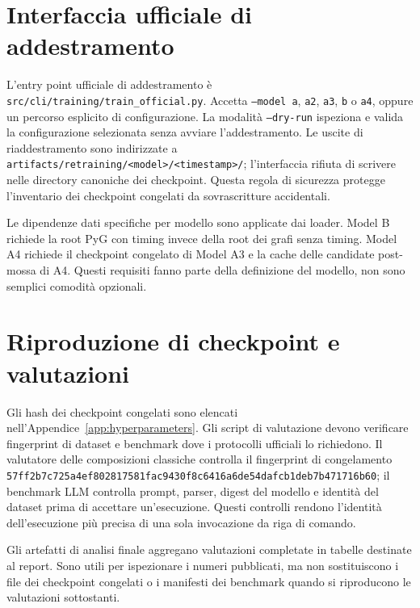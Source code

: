 

\section{Interfaccia ufficiale di addestramento}
\label{app:reproducibility:training}

L'entry point ufficiale di addestramento è \texttt{src/cli/training/train\_official.py}.  Accetta \texttt{--model a}, \texttt{a2}, \texttt{a3}, \texttt{b} o \texttt{a4}, oppure un percorso esplicito di configurazione.  La modalità \texttt{--dry-run} ispeziona e valida la configurazione selezionata senza avviare l'addestramento.  Le uscite di riaddestramento sono indirizzate a \texttt{artifacts/retraining/<model>/<timestamp>/}; l'interfaccia rifiuta di scrivere nelle directory canoniche dei checkpoint.  Questa regola di sicurezza protegge l'inventario dei checkpoint congelati da sovrascritture accidentali.

Le dipendenze dati specifiche per modello sono applicate dai loader.  Model B richiede la root PyG con timing invece della root dei grafi senza timing.  Model A4 richiede il checkpoint congelato di Model A3 e la cache delle candidate post-mossa di A4.  Questi requisiti fanno parte della definizione del modello, non sono semplici comodità opzionali.

\section{Riproduzione di checkpoint e valutazioni}
\label{app:reproducibility:evaluation}

Gli hash dei checkpoint congelati sono elencati nell'Appendice~\ref{app:hyperparameters}.  Gli script di valutazione devono verificare fingerprint di dataset e benchmark dove i protocolli ufficiali lo richiedono.  Il valutatore delle composizioni classiche controlla il fingerprint di congelamento \nolinkurl{57ff2b7c725a4ef802817581fac9430f8c6416a6de54dafcb1deb7b471716b60}; il benchmark LLM controlla prompt, parser, digest del modello e identità del dataset prima di accettare un'esecuzione.  Questi controlli rendono l'identità dell'esecuzione più precisa di una sola invocazione da riga di comando.

Gli artefatti di analisi finale aggregano valutazioni completate in tabelle destinate al report.  Sono utili per ispezionare i numeri pubblicati, ma non sostituiscono i file dei checkpoint congelati o i manifesti dei benchmark quando si riproducono le valutazioni sottostanti.

